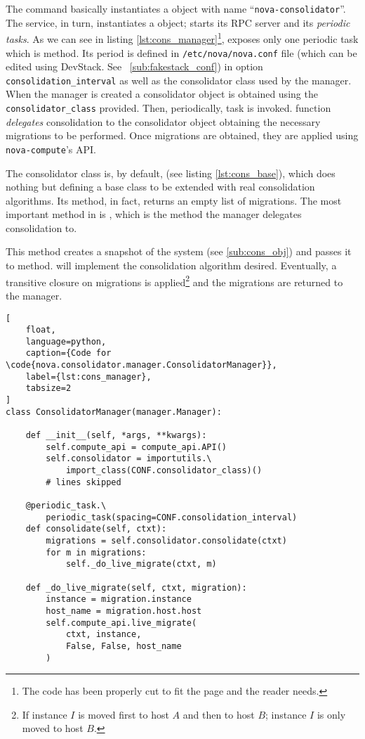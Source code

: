 The command basically instantiates a  object with name ``\texttt{nova-consolidator}''. The service, in turn, instantiates a  object; starts its RPC server and its \emph{periodic tasks}. As we can see in listing \ref{lst:cons_manager}\footnote{\label{note:cons_code}The code has been properly cut to fit the page and the reader needs.},  exposes only one periodic task which is  method.
Its period is defined in \texttt{/etc/nova/nova.conf} file (which can be edited using DevStack. See ~\ref{sub:fakestack_conf}) in option \texttt{consolidation\_interval} as well as the consolidator class used by the manager. When the manager is created a consolidator object is obtained using the \texttt{consolidator\_class} provided. Then, periodically,  task is invoked.  function \emph{delegates} consolidation to the consolidator object obtaining the necessary migrations to be performed. Once migrations are obtained, they are applied using \texttt{nova-compute}'s API.

The consolidator class is, by default,  (see listing \ref{lst:cons_base}), which does nothing but defining a base class to be extended with real consolidation algorithms. Its  method, in fact, returns an empty list of migrations. The most important method in  is , which is the method the manager delegates consolidation to.

This method creates a snapshot of the system (see \ref{sub:cons_obj}) and passes it to  method.  will implement the consolidation algorithm desired. Eventually, a transitive closure on migrations is applied\footnote{If instance $I$ is moved first to host $A$ and then to host $B$; instance $I$ is only moved to host $B$.} and the migrations are returned to the manager.

\begin{lstlisting}[
	float,
	language=python,
	caption={Code for \code{nova.consolidator.manager.ConsolidatorManager}},
	label={lst:cons_manager},
	tabsize=2
]
class ConsolidatorManager(manager.Manager):

	def __init__(self, *args, **kwargs):
		self.compute_api = compute_api.API()
		self.consolidator = importutils.\
			import_class(CONF.consolidator_class)()
		# lines skipped

	@periodic_task.\
		periodic_task(spacing=CONF.consolidation_interval)
	def consolidate(self, ctxt):
		migrations = self.consolidator.consolidate(ctxt)
		for m in migrations:
			self._do_live_migrate(ctxt, m)

	def _do_live_migrate(self, ctxt, migration):
		instance = migration.instance
		host_name = migration.host.host
		self.compute_api.live_migrate(
			ctxt, instance,
			False, False, host_name
		)
\end{lstlisting}

